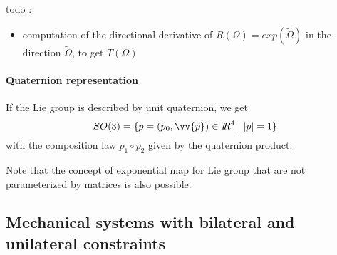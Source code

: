 \begin{ndrva}
  todo :
  \begin{itemize}
  \item computation of the directional derivative of $R(\Omega)= exp(\tilde \Omega)$ in the direction $\tilde\Omega$, to get $T(\Omega)$  
  \end{itemize}
\end{ndrva}

\paragraph{Quaternion representation}If the Lie group is described by unit quaternion, we get
\begin{equation}
  \label{eq:47}
  SO(3) = \{p = (p_0,\vv{p}) \in \RR^{4}\mid |p|=1  \}
\end{equation}
with the composition law  $p_1\circ p_2$ given by the quaternion product.



Note that the concept of exponential map for Lie group that are not parameterized by matrices is also possible.


\subsection{Mechanical systems  with bilateral and unilateral constraints}
\label{section22}


